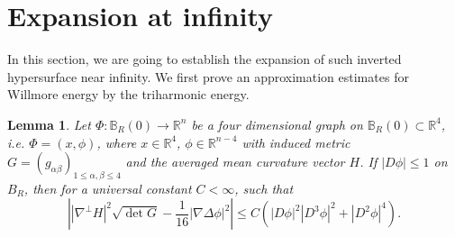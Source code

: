 \documentclass[11pt,letterpaper]{amsart}
\newcommand{\bB}{\mathbb{B}}
\newcommand{\bR}{\mathbb{R}}
\newtheorem{lemma}[theorem]{Lemma}
\theoremstyle{definition}
\theoremstyle{remark}
\numberwithin{equation}{section}
\begin{document}
\section{Expansion at infinity}\label{expansion-at-infinity}
In this section, we are going to establish the expansion of such inverted hypersurface near infinity. We first prove an approximation estimates for Willmore energy by the triharmonic energy.
\begin{lemma}\label{technique--lemma}
    Let $\Phi: \bB_R(0) \to \mathbb{R}^n$ be a four dimensional graph on $\bB_R(0)\subset \bR^4$, i.e. $\Phi=(x, \phi)$, where $x\in \bR^4$, $\phi\in \bR^{n-4}$ with induced metric $G=(g_{\alpha\beta})_{1 \leqslant \alpha,\beta \leqslant 4}$ and the averaged mean curvature vector $H$. If $|D \phi| \leqslant 1$ on $B_R$, then for a universal constant $C < \infty$, such that 
    \begin{equation}
       \left| |\nabla^\perp H|^2 \sqrt{\det G}-\frac{1}{16}|\nabla \Delta \phi|^2\right| \leqslant C \left(|D \phi|^2 |D^3 \phi|^2+|D^2\phi|^4\right).
    \end{equation}
\end{lemma}
\end{document}
